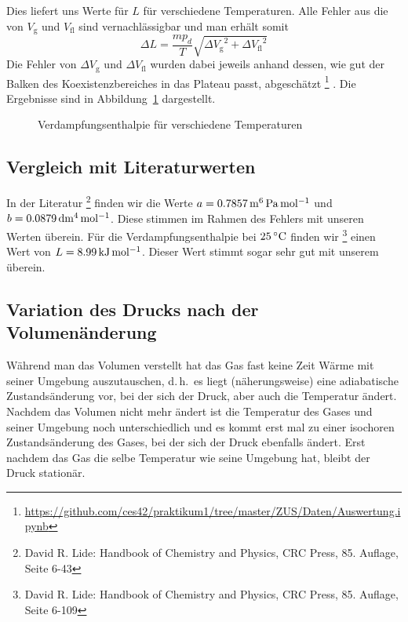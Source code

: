 Dies liefert uns Werte für $L$ für verschiedene Temperaturen. Alle Fehler aus die von $V_\mathrm{g}$ und $V_\mathrm{fl}$ sind vernachlässigbar und man erhält somit 
\[
    \Delta L = \frac{m p_d}{T} \sqrt{{\Delta V_\mathrm{g}}^2 + {\Delta V_\mathrm{fl}}^2}
\]
Die Fehler von $\Delta V_\mathrm{g}$ und $\Delta V_\mathrm{fl}$ wurden dabei jeweils anhand dessen, wie gut der Balken des Koexistenzbereiches in das Plateau passt, abgeschätzt%
\footnote{\url{https://github.com/ces42/praktikum1/tree/master/ZUS/Daten/Auswertung.ipynb}}%
. Die Ergebnisse sind in Abbildung~\ref{diag:L} dargestellt.

\begin{figure}
    
    \caption{Verdampfungsenthalpie für verschiedene Temperaturen}
    \label{diag:L}
\end{figure}


\subsection{Vergleich mit Literaturwerten}

In der Literatur%
\footnote{David R. Lide: Handbook of Chemistry and Physics, CRC Press, 85. Auflage, Seite 6-43}
finden wir die Werte $a = \unit[0.7857]{m^6\, Pa\, mol^{-1}}$ und $b = \unit[0.0879]{dm^4\, mol^{-1}}$. Diese stimmen im Rahmen des Fehlers mit unseren Werten überein. Für die Verdampfungsenthalpie bei $\unit[25]{ ^\circ C}$ finden wir%
\footnote{David R. Lide: Handbook of Chemistry and Physics, CRC Press, 85. Auflage, Seite 6-109}
einen Wert von $L = \unit[8.99]{kJ\, mol^{-1}}$. Dieser Wert stimmt sogar sehr gut mit unserem überein.

\subsection{Variation des Drucks nach der Volumenänderung}

Während man das Volumen verstellt hat das Gas fast keine Zeit Wärme mit seiner Umgebung auszutauschen, d.\,h.\ es liegt (näherungsweise) eine adiabatische Zustandsänderung vor, bei der sich der Druck, aber auch die Temperatur ändert. Nachdem das Volumen nicht mehr ändert ist die Temperatur des Gases und seiner Umgebung noch unterschiedlich und es kommt erst mal zu einer isochoren Zustandsänderung des Gases, bei der sich der Druck ebenfalls ändert. Erst nachdem das Gas die selbe Temperatur wie seine Umgebung hat, bleibt der Druck stationär.

